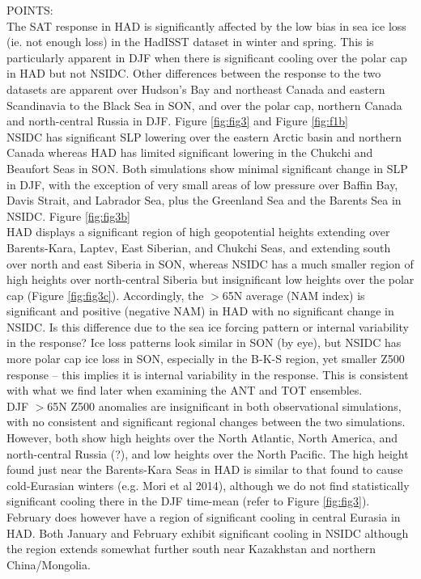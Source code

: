 \documentclass[twocol]{ametsoc}
\begin{document}
POINTS:\\
The SAT response in HAD is significantly affected by the low bias in sea ice loss (ie. not enough loss) in the HadISST dataset in winter and spring. This is particularly apparent in DJF when there is significant cooling over the polar cap in HAD but not NSIDC. Other differences between the response to the two datasets are apparent over Hudson's Bay and northeast Canada and eastern Scandinavia to the Black Sea in SON, and over the polar cap, northern Canada and north-central Russia in DJF. Figure \ref{fig:fig3} and Figure \ref{fig:f1b}\\

NSIDC has significant SLP lowering over the eastern Arctic basin and northern Canada whereas HAD has limited significant lowering in the Chukchi and Beaufort Seas in SON. Both simulations show minimal significant change in SLP in DJF, with the exception of very small areas of low pressure over Baffin Bay, Davis Strait, and Labrador Sea, plus the Greenland Sea and the Barents Sea in NSIDC. Figure \ref{fig:fig3b}\\

HAD displays a significant region of high geopotential heights extending over Barents-Kara, Laptev, East Siberian, and Chukchi Seas, and extending south over north and east Siberia in SON, whereas NSIDC has a much smaller region of high heights over north-central Siberia but insignificant low heights over the polar cap (Figure \ref{fig:fig3c}). Accordingly, the $>$65N average (NAM index) is significant and positive (negative NAM) in HAD with no significant change in NSIDC. Is this difference due to the sea ice forcing pattern or internal variability in the response? Ice loss patterns look similar in SON (by eye), but NSIDC has more polar cap ice loss in SON, especially in the B-K-S region, yet smaller Z500 response -- this implies it is internal variability in the response. This is consistent with what we find later when examining the ANT and TOT ensembles.\\

DJF $>$65N Z500 anomalies are insignificant in both observational simulations, with no consistent and significant regional changes between the two simulations. However, both show high heights over the North Atlantic, North America, and north-central Russia (?), and low heights over the North Pacific. The high height found just near the Barents-Kara Seas in HAD is similar to that found to cause cold-Eurasian winters (e.g. Mori et al 2014), although we do not find statistically significant cooling there in the DJF time-mean (refer to Figure \ref{fig:fig3}). February does however have a region of significant cooling in central Eurasia in HAD. Both January and February exhibit significant cooling in NSIDC although the region extends somewhat further south near Kazakhstan and northern China/Mongolia.\\
\end{document}
